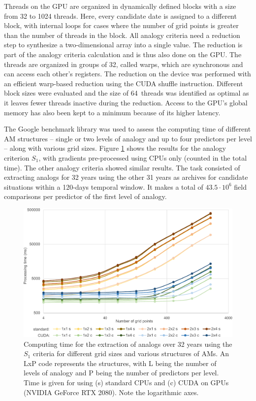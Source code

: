 \documentclass[draft]{agujournal2019}
\begin{document}
Threads on the GPU are organized in dynamically defined blocks with a size from 32 to 1024 threads. Here, every candidate date is assigned to a different block, with internal loops for cases where the number of grid points is greater than the number of threads in the block. All analogy criteria need a reduction step to synthesize a two-dimensional array into a single value. The reduction is part of the analogy criteria calculation and is thus also done on the GPU. The threads are organized in groups of 32, called warps, which are synchronous and can access each other's registers. The reduction on the device was performed with an efficient warp-based reduction using the CUDA shuffle instruction. Different block sizes were evaluated and the size of 64~threads was identified as optimal as it leaves fewer threads inactive during the reduction. Access to the GPU's global memory has also been kept to a minimum because of its higher latency.

The Google benchmark library was used to assess the computing time of different AM structures -- single or two levels of analogy and up to four predictors per level -- along with various grid sizes. Figure \ref{cuda} shows the results for the analogy criterion $S_{1}$, with gradients pre-processed using CPUs only (counted in the total time). The other analogy criteria showed similar results. The task consisted of extracting analogs for 32 years using the other 31 years as archives for candidate situations within a 120-days temporal window. It makes a total of $43.5\cdot10^6$ field comparisons per predictor of the first level of analogy.

\begin{figure}[hbt]
	\noindent\includegraphics[width=130mm]{figures/cuda-timing.pdf}
	\caption{Computing time for the extraction of analogs over 32 years using the $S_{1}$ criteria for different grid sizes and various structures of AMs. An LxP code represents the structures, with L being the number of levels of analogy and P being the number of predictors per level. Time is given for using (s) standard CPUs and (c) CUDA on GPUs (NVIDIA GeForce RTX 2080). Note the logarithmic axes.}
	\label{cuda}
\end{figure}
\end{document}
